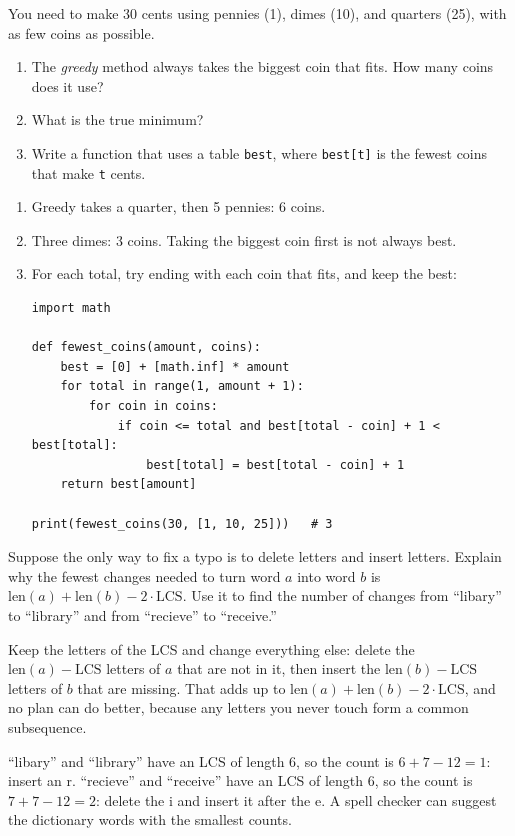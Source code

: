 \begin{Exercise}[title={Making Change}, label=dp_coins]
You need to make 30 cents using pennies (1), dimes (10), and quarters (25), with as few coins as possible.
\begin{enumerate}
\item The \emph{greedy} method always takes the biggest coin that fits. How many coins does it use?
\item What is the true minimum?
\item Write a function  that uses a table \verb|best|, where
\verb|best[t]| is the fewest coins that make \verb|t| cents.
\end{enumerate}
\end{Exercise}
\begin{Answer}[ref=dp_coins]
\begin{enumerate}
\item Greedy takes a quarter, then 5 pennies: 6 coins.
\item Three dimes: 3 coins. Taking the biggest coin first is not always best.
\item For each total, try ending with each coin that fits, and keep the best:
\begin{verbatim}
import math

def fewest_coins(amount, coins):
    best = [0] + [math.inf] * amount
    for total in range(1, amount + 1):
        for coin in coins:
            if coin <= total and best[total - coin] + 1 < best[total]:
                best[total] = best[total - coin] + 1
    return best[amount]

print(fewest_coins(30, [1, 10, 25]))   # 3
\end{verbatim}
\end{enumerate}
\end{Answer}

\begin{Exercise}[title={Spell Check}, label=dp_spell]
Suppose the only way to fix a typo is to delete letters and insert letters. Explain why the fewest changes
needed to turn word $a$ into word $b$ is $\text{len}(a) + \text{len}(b) - 2 \cdot \text{LCS}$. Use it to find
the number of changes from ``libary'' to ``library'' and from ``recieve'' to ``receive.''
\end{Exercise}
\begin{Answer}[ref=dp_spell]
Keep the letters of the LCS and change everything else: delete the $\text{len}(a) - \text{LCS}$ letters of $a$
that are not in it, then insert the $\text{len}(b) - \text{LCS}$ letters of $b$ that are missing. That adds up
to $\text{len}(a) + \text{len}(b) - 2 \cdot \text{LCS}$, and no plan can do better, because any letters you
never touch form a common subsequence.

``libary'' and ``library'' have an LCS of length 6, so the count is $6 + 7 - 12 = 1$: insert an r.
``recieve'' and ``receive'' have an LCS of length 6, so the count is $7 + 7 - 12 = 2$: delete the i and insert
it after the e. A spell checker can suggest the dictionary words with the smallest counts.
\end{Answer}

